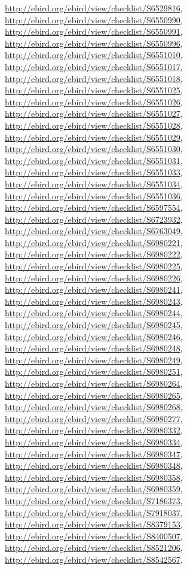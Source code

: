 \documentclass[9pt, article]{memoir}
\begin{document}
\begin{multicols}{2}
\url{http://ebird.org/ebird/view/checklist/S6529816}, 
\url{http://ebird.org/ebird/view/checklist/S6550990}, 
\url{http://ebird.org/ebird/view/checklist/S6550991}, 
\url{http://ebird.org/ebird/view/checklist/S6550996}, 
\url{http://ebird.org/ebird/view/checklist/S6551010}, 
\url{http://ebird.org/ebird/view/checklist/S6551017}, 
\url{http://ebird.org/ebird/view/checklist/S6551018}, 
\url{http://ebird.org/ebird/view/checklist/S6551025}, 
\url{http://ebird.org/ebird/view/checklist/S6551026}, 
\url{http://ebird.org/ebird/view/checklist/S6551027}, 
\url{http://ebird.org/ebird/view/checklist/S6551028}, 
\url{http://ebird.org/ebird/view/checklist/S6551029}, 
\url{http://ebird.org/ebird/view/checklist/S6551030}, 
\url{http://ebird.org/ebird/view/checklist/S6551031}, 
\url{http://ebird.org/ebird/view/checklist/S6551033}, 
\url{http://ebird.org/ebird/view/checklist/S6551034}, 
\url{http://ebird.org/ebird/view/checklist/S6551036}, 
\url{http://ebird.org/ebird/view/checklist/S6597554}, 
\url{http://ebird.org/ebird/view/checklist/S6723932}, 
\url{http://ebird.org/ebird/view/checklist/S6763049}, 
\url{http://ebird.org/ebird/view/checklist/S6980221}, 
\url{http://ebird.org/ebird/view/checklist/S6980222}, 
\url{http://ebird.org/ebird/view/checklist/S6980225}, 
\url{http://ebird.org/ebird/view/checklist/S6980226}, 
\url{http://ebird.org/ebird/view/checklist/S6980241}, 
\url{http://ebird.org/ebird/view/checklist/S6980243}, 
\url{http://ebird.org/ebird/view/checklist/S6980244}, 
\url{http://ebird.org/ebird/view/checklist/S6980245}, 
\url{http://ebird.org/ebird/view/checklist/S6980246}, 
\url{http://ebird.org/ebird/view/checklist/S6980248}, 
\url{http://ebird.org/ebird/view/checklist/S6980249}, 
\url{http://ebird.org/ebird/view/checklist/S6980251}, 
\url{http://ebird.org/ebird/view/checklist/S6980264}, 
\url{http://ebird.org/ebird/view/checklist/S6980265}, 
\url{http://ebird.org/ebird/view/checklist/S6980268}, 
\url{http://ebird.org/ebird/view/checklist/S6980277}, 
\url{http://ebird.org/ebird/view/checklist/S6980332}, 
\url{http://ebird.org/ebird/view/checklist/S6980334}, 
\url{http://ebird.org/ebird/view/checklist/S6980347}, 
\url{http://ebird.org/ebird/view/checklist/S6980348}, 
\url{http://ebird.org/ebird/view/checklist/S6980358}, 
\url{http://ebird.org/ebird/view/checklist/S6980359}, 
\url{http://ebird.org/ebird/view/checklist/S7186373}, 
\url{http://ebird.org/ebird/view/checklist/S7918037}, 
\url{http://ebird.org/ebird/view/checklist/S8379153}, 
\url{http://ebird.org/ebird/view/checklist/S8400507}, 
\url{http://ebird.org/ebird/view/checklist/S8521206}, 
\url{http://ebird.org/ebird/view/checklist/S8542567}.


\end{multicols}
\end{document}
